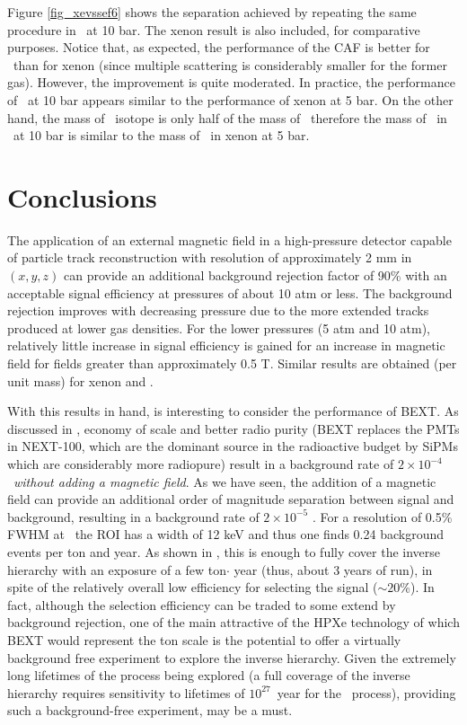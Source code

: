 \documentclass{JINST}
\begin{document}
Figure \ref{fig_xevssef6} shows the separation achieved by repeating the same procedure in \SEHF\ at 10 bar. The xenon result is also included, for comparative purposes. Notice that, as expected, the performance of the CAF is better for \SEHF\ than for xenon (since multiple scattering is considerably smaller for the former gas). However, the improvement is quite moderated. In practice, the performance of \SEHF\ at 10 bar appears similar to the performance of xenon at 5 bar. On the other hand, the mass of \SE\ isotope is only half of the mass of \SEHF\, therefore the mass of \SE\ in \SEHF\ at 10 bar is similar to the mass of \XE\ in xenon at 5 bar. 

\section{Conclusions}
The application of an external magnetic field in a high-pressure detector capable of particle track reconstruction with resolution of approximately 2 mm in $(x,y,z)$ can provide an additional background rejection factor of 90\% with an acceptable signal efficiency at pressures of about 10 atm or less.  The background rejection improves with decreasing pressure due to the more extended tracks produced at lower gas densities.  For the lower pressures (5 atm and 10 atm), relatively little increase in signal efficiency is gained for an increase in magnetic field for fields greater than approximately 0.5 T. Similar results are obtained (per unit mass) for xenon and \SEHF.

With this results in hand, is interesting to consider the performance of BEXT. As discussed in \cite{Gomez-Cadenas:2015bext}, economy of scale and better radio purity (BEXT replaces the PMTs in NEXT-100, which are the dominant source in the radioactive budget by SiPMs which are considerably more radiopure) result in a background rate of $2 \times 10^{-4}$ \ckky\ {\em without adding a magnetic field}. As we have seen, the addition of a magnetic field can provide an additional order of magnitude separation between signal and background, resulting in a background rate of $2 \times 10^{-5}$ \ckky.  For a resolution of 0.5\% FWHM at \Qbb\ the ROI has a width of 12 keV and thus one finds 0.24 background events per ton and year. As shown in \cite{Gomez-Cadenas:2015bext}, this is enough to fully cover the inverse hierarchy with an exposure of a few ton$\cdot$ year (thus, about 3 years of run), in spite of the relatively overall low efficiency for selecting the signal ($\sim 20$\%). In fact, although the selection efficiency can be traded to some extend by background rejection, one of the main attractive of the HPXe technology of which BEXT would represent the ton scale is the potential to offer a virtually background free experiment to explore the inverse hierarchy. Given the extremely long lifetimes of the process being explored (a full coverage of the inverse hierarchy requires sensitivity to lifetimes of $10^{27}$~year for the \bbonu\ process), providing such a background-free experiment, may be a must. 
\end{document}
